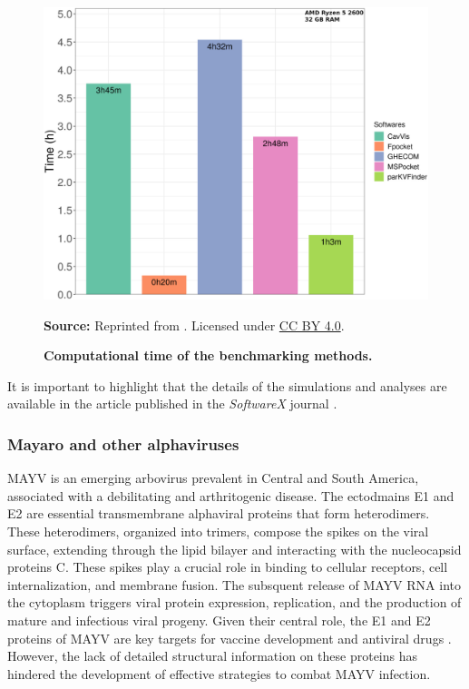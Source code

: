 \documentclass[Ingles]{phdthesis}
\begin{document}
\begin{figure}[H]
  \centerline{\includegraphics[scale=0.9]{images/hiv1-protease-dm-times.png}}
  \centerline{\tiny{\textbf{Source:} Reprinted from \cite{guerra2020}. Licensed under \href{https://creativecommons.org/licenses/by/4.0/}{CC BY 4.0}.}}
  \caption[Computational time of the benchmarking methods]{\textbf{Computational time of the benchmarking methods.}}
  \label{fig:hiv1-protease-dm-times}
\end{figure}

It is important to highlight that the details of the simulations and analyses are available in the article published in the \textit{SoftwareX} journal \cite{guerra2020}.

\subsubsection{Mayaro and other alphaviruses}

\ac{MAYV} is an emerging arbovirus prevalent in Central and South America, associated with a debilitating and arthritogenic disease. The ectodmains E1 and E2 are essential transmembrane alphaviral proteins that form heterodimers. These heterodimers, organized into trimers, compose the spikes on the viral surface, extending through the lipid bilayer and interacting with the nucleocapsid proteins C. These spikes play a crucial role in binding to cellular receptors, cell internalization, and membrane fusion. The subsquent release of \acs{MAYV} RNA into the cytoplasm triggers viral protein expression, replication, and the production of mature and infectious viral progeny. Given their central role, the E1 and E2 proteins of \acs{MAYV} are key targets for vaccine development and antiviral drugs \cite{ribeiro2021}. However, the lack of detailed structural information on these proteins has hindered the development of effective strategies to combat \acs{MAYV} infection.
\end{document}
